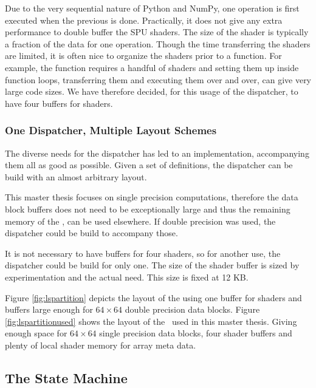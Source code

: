 Due to the very sequential nature of Python and NumPy, one operation
is first executed when the previous is done. Practically, it does not
give any extra performance to double buffer the SPU shaders. The size
of the shader is typically a fraction of the data for one
operation. Though the time transferring the shaders are limited, it is
often nice to organize the shaders prior to a function. For example,
the function  requires a handful of shaders and
setting them up inside function loops, transferring them and executing
them over and over, can give very large code sizes. We have therefore
decided, for this usage of the dispatcher, to have four buffers for
shaders.

\subsubsection{One Dispatcher, Multiple Layout Schemes}

The diverse needs for the dispatcher has led to an implementation,
accompanying them all as good as possible. Given a set of definitions,
the dispatcher can be build with an almost arbitrary layout.

This master thesis focuses on single precision computations, therefore
the data block buffers does not need to be exceptionally large and
thus the remaining memory of the \LS{}, can be used elsewhere. If
double precision was used, the dispatcher could be build to accompany
those.

It is not necessary to have buffers for four shaders, so for another
use, the dispatcher could be build for only one. The size of the
shader buffer is sized by experimentation and the actual need. This
size is fixed at 12 KB.

Figure \ref{fig:lspartition} depicts the layout of the \LS{} using one
buffer for shaders and buffers large enough for $64 \times 64$ double
precision data blocks. Figure \ref{fig:lspartitionused} shows the
layout of the \LS\ used in this master thesis. Giving enough space for
$64 \times 64$ single precision data blocks, four shader buffers and
plenty of local shader memory for array meta data.



\subsection{The State Machine}

